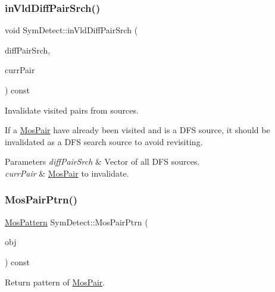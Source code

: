\subsubsection{\texorpdfstring{in\+Vld\+Diff\+Pair\+Srch()}{inVldDiffPairSrch()}}
{\footnotesize\ttfamily void Sym\+Detect\+::in\+Vld\+Diff\+Pair\+Srch (\begin{DoxyParamCaption}\item[{std\+::vector$<$ \hyperlink{classMosPair}{Mos\+Pair} $>$ \&}]{diff\+Pair\+Srch,  }\item[{\hyperlink{classMosPair}{Mos\+Pair} \&}]{curr\+Pair }\end{DoxyParamCaption}) const\hspace{0.3cm}{\ttfamily [private]}}



Invalidate visited pairs from sources. 

If a \hyperlink{classMosPair}{Mos\+Pair} have already been visited and is a D\+FS source, it should be invalidated as a D\+FS search source to avoid revisiting.


\begin{DoxyParams}{Parameters}
{\em diff\+Pair\+Srch} & Vector of all D\+FS sources. \\
\hline
{\em curr\+Pair} & \hyperlink{classMosPair}{Mos\+Pair} to invalidate. \\
\hline
\end{DoxyParams}
\mbox{\label{classSymDetect_aa832e51051f0ed9d3643c72b1d738684}} 
\subsubsection{\texorpdfstring{Mos\+Pair\+Ptrn()}{MosPairPtrn()}}
{\footnotesize\ttfamily \hyperlink{type_8h_af19eddb079bfea723256710b029c38e8}{Mos\+Pattern} Sym\+Detect\+::\+Mos\+Pair\+Ptrn (\begin{DoxyParamCaption}\item[{\hyperlink{classMosPair}{Mos\+Pair} \&}]{obj }\end{DoxyParamCaption}) const\hspace{0.3cm}{\ttfamily [private]}}



Return pattern of \hyperlink{classMosPair}{Mos\+Pair}. 

\mbox{\label{classSymDetect_a7f4cd1010a21da88d35abb89c6f33f00}} 
